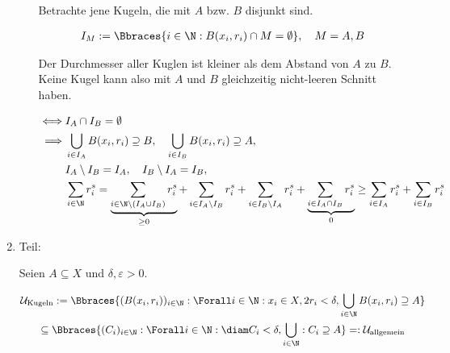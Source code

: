 \begin{solution}
\begin{enumerate}[label = \arabic*.]
\begin{enumerate}
        Betrachte jene Kugeln, die mit $A$ bzw. $B$ disjunkt sind.

        \begin{align*}
            I_M
            :=
            \Bbraces
            {
                i \in \N:
                B(x_i, r_i) \cap M = \emptyset
            },
            \quad
            M = A, B
        \end{align*}

        Der Durchmesser aller Kuglen ist kleiner als dem Abstand von $A$ zu $B$.
        Keine Kugel kann also mit $A$ und $B$ gleichzeitig nicht-leeren Schnitt haben.

        \begin{align*}
            \iff
            &
            I_A \cap I_B = \emptyset \\
            \implies
            &
            \bigcup_{i \in I_A}
                B(x_i, r_i)
            \supseteq
            B,
            \quad
            \bigcup_{i \in I_B}
                B(x_i, r_i)
            \supseteq
            A, \\
            &
            I_A \setminus I_B = I_A,
            \quad
            I_B \setminus I_A = I_B, \\
            &
            \sum_{i \in \N}
                r_i^s
            =
            \underbrace
            {
                \sum_{i \in \N \setminus (I_A \cup I_B)}
                r_i^s
            }_{\geq 0}
            +
            \sum_{i \in I_A \setminus I_B}
                r_i^s
            +
            \sum_{i \in I_B \setminus I_A}
                r_i^s
            +
            \underbrace
            {
                \sum_{i \in I_A \cap I_B}
                r_i^s                
            }_0
            \geq
            \sum_{i \in I_A}
                r_i^s
            +
            \sum_{i \in I_B}
                r_i^s            
        \end{align*}



    \end{enumerate}

    \item Teil:
    
    Seien $A \subseteq X$ und $\delta, \varepsilon > 0$.

    \begin{multline*}
        \mathcal{U}_\text{Kugeln}
        :=
        \Bbraces
        {
            (B(x_i, r_i))_{i \in \N}:
            \Forall i \in \N:
                x_i \in X,
                2 r_i < \delta,
            \bigcup_{i \in \N}
                B(x_i, r_i)
            \supseteq
            A
        } \\
        \subseteq
        \Bbraces
        {
            (C_i)_{i \in \N}:
            \Forall i \in \N:
                \diam C_i < \delta,
            \bigcup_{i \in \N}:
                C_i
            \supseteq
            A
        }
        =:
        \mathcal{U}_\text{allgemein}
    \end{multline*}


\end{enumerate}
\end{solution}
